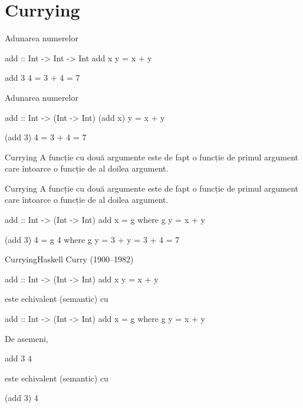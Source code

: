 \documentclass[handout,xcolor=pdftex,romanian,colorlinks]{beamer}
\begin{document}
\section{Currying}

\begin{frame}[fragile]{Adunarea numerelor}
\begin{asciihs}
add :: Int -> Int -> Int
add x y = x + y


  add 3 4
=
  3 + 4
=
  7
\end{asciihs}

\end{frame}

\begin{frame}[fragile]{Adunarea numerelor}
\begin{asciihs}
add :: Int -> (Int -> Int)
(add x) y = x + y


  (add 3) 4
=
  3 + 4
=
  7
\end{asciihs}

\begin{block}{Currying}
A funcție cu două argumente este de fapt o funcție de primul argument
care întoarce o funcție de al doilea argument.
\end{block}
\end{frame}

\begin{frame}[fragile]{Currying}
A funcție cu două argumente este de fapt o funcție de primul argument
care întoarce o funcție de al doilea argument.
\begin{asciihs}
add :: Int -> (Int -> Int)
add x = g
  where
  g y = x + y

  (add 3) 4
=
  g 4
    where
    g y = 3 + y
=
  3 + 4
=
  7
\end{asciihs}
\end{frame}



\begin{frame}[fragile]{Currying}{Haskell Curry (1900--1982)}
\begin{asciihs}
add :: Int -> (Int -> Int)
add x y = x + y
\end{asciihs}
este echivalent (semantic) cu 
\begin{asciihs}
add :: Int -> (Int -> Int)
add x = g
  where
  g y = x + y
\end{asciihs}

\vfill
De asemeni,
\begin{asciihs}
  add 3 4
\end{asciihs}
este echivalent (semantic) cu 
\begin{asciihs}
  (add 3) 4
\end{asciihs}
\end{frame}
\end{document}
